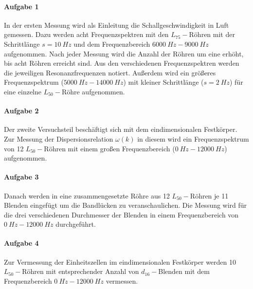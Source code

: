\paragraph{Aufgabe 1}
In der ersten Messung wird als Einleitung die Schallgeschwindigkeit in Luft gemessen.
Dazu werden acht Frequenzspektren mit den $L_{75}-$Röhren mit der Schrittlänge $ s= \SI{10}{Hz}$ und dem Frequenzbereich $\SI{6000}{Hz} - \SI{9000}{Hz}$ aufgenommen.
Nach jeder Messung wird die Anzahl der Röhren um eine erhöht, bis acht Röhren erreicht sind.
Aus den verschiedenen Frequenzspektren werden die jeweiligen Resonanzfrequenzen notiert.
Außerdem wird ein größeres Frequenzspektrum ($\SI{5000}{Hz}-\SI{14000}{Hz}$) mit kleiner Schrittlänge ($s = \SI{2}{Hz}$) für eine einzelne $L_{50}-$Röhre aufgenommen.\\
%
\paragraph{Aufgabe 2}
Der zweite Versuchsteil beschäftigt sich mit dem eindimensionalen Festkörper.
Zur Messung der Dispersionsrelation $\omega(k)$ in diesem wird ein Frequenzspektrum von 12 $L_{50}-$Röhren mit einem großen Frequenzbereich ($\SI{0}{Hz}-\SI{12000}{Hz}$) aufgenommen.\\
%
\paragraph{Aufgabe 3}
Danach werden in eine zusammengesetzte Röhre aus 12 $L_{50}-$Röhren je 11 Blenden eingefügt um die Bandlücken zu veranschaulichen.
Die Messung wird für die drei verschiedenen Durchmesser der Blenden in einem Frequenzbereich von $\SI{0}{Hz}-\SI{12000}{Hz}$ durchgeführt.\\
%
\paragraph{Aufgabe 4}
Zur Vermessung der Einheitszellen im eindimensionalen Festkörper werden 10 $L_{50}-$Röhren mit entsprechender Anzahl von $d_{16}-$Blenden mit dem Frequenzbereich $\SI{0}{Hz}-\SI{12000}{Hz}$ vermessen.\\
%
